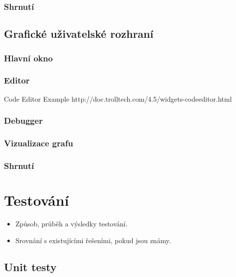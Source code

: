 \documentclass[11pt,twoside,a4paper]{book}
\begin{document}
\subsection{Shrnutí}



\section{Grafické uživatelské rozhraní}

\subsection{Hlavní okno}

\subsection{Editor}

Code Editor Example
http://doc.trolltech.com/4.5/widgets-codeeditor.html

\subsection{Debugger}

\subsection{Vizualizace grafu}

\subsection{Shrnutí}




\chapter{Testování}

\begin{itemize}
 \item Způsob, průběh a výsledky testování.
 \item Srovnání s existujícími řešeními, pokud jsou známy.
\end{itemize}

\section{Unit testy}
\end{document}
